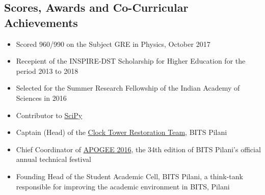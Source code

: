 \documentclass[margin, centered]{res}
\begin{document}
\begin{resume}
\section{Scores, Awards and Co-Curricular Achievements}
\begin{itemize}[leftmargin=*]
 \item Scored 960/990 on the Subject GRE in Physics, October 2017
 \item Recepient of the INSPIRE-DST Scholarship for Higher Education for the period 2013 to 2018
 \item Selected for the Summer Research Fellowship of the Indian Academy of Sciences in 2016
 \item Contributor to \href{https://www.scipy.org/}{SciPy}
 \item Captain (Head) of the \href{http://www.bits-clocktower.org/}{Clock Tower Restoration Team}, BITS Pilani
 \item Chief Coordinator of \href{https://bits-apogee.org/2016/}{APOGEE 2016}, the 34th edition of BITS Pilani's official annual technical festival
 \item Founding Head of the Student Academic Cell, BITS Pilani, a think-tank responsible for improving the academic environment in BITS, Pilani
\end{itemize}




\end{resume}
\end{document}
